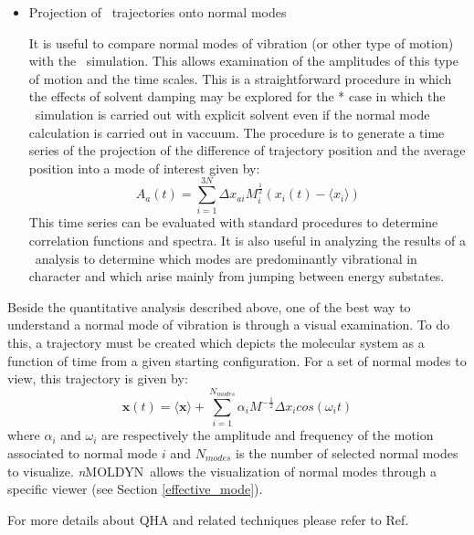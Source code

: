 \documentclass[a4paper,11pt]{report}
\newcommand{\NMOLDYN}{\textit{n}MOLDYN}
\begin{document}
\begin{itemize}
\item Projection of \MD\ trajectories onto normal modes

It is useful to compare normal modes of vibration (or other type of motion) with the \MD\ simulation. This allows examination of the 
amplitudes of this type of motion and the time scales. This is a straightforward procedure in which the effects of solvent damping may be explored for the *
case in which the \MD\ simulation is carried out with explicit solvent even if the normal mode calculation is carried out in vaccuum. The procedure 
is to generate a time series of the projection of the difference of trajectory position and the average position into a mode of interest given by:
\begin{equation}
\label{eq:qha_at}
A_a(t) = \sum_{i=1}^{3N} \Delta x_{ai} M_i^{\frac{1}{2}} \left(x_i(t) - \langle x_i\rangle\right)
\end{equation}
This time series can be evaluated with standard procedures to determine correlation functions and spectra. It is also useful in analyzing the 
results of a \QHA\ analysis to determine which modes are predominantly vibrational in character and which arise mainly from jumping between energy 
substates.
\end{itemize}

Beside the quantitative analysis described above, one of the best way to understand a normal mode of vibration is through a 
visual examination. To do this, a trajectory must be created which depicts the molecular system as a function of time from a 
given starting configuration. For a set of normal modes to view, this trajectory is given by:
\begin{equation}
\label{eq:qha_trajectory}
\textbf{x}(t) = \langle \textbf{x} \rangle + \sum_{i=1}^{N_{modes}} \alpha_i M^{-\frac{1}{2}}\Delta x_i cos(\omega_i t)
\end{equation}
where $\alpha_i$ and $\omega_i$ are respectively the amplitude and frequency of the motion associated to normal mode $i$ and 
$N_{modes}$ is the number of selected normal modes to visualize. \NMOLDYN\ allows the visualization of normal modes through a 
specific viewer (see Section \ref{effective_mode}).

For more details about QHA and related techniques please refer to Ref. \cite{Karplus}
\end{document}
